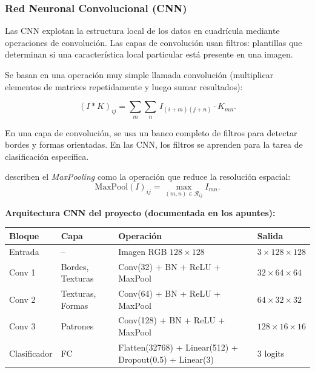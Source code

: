 \documentclass[12pt, a4paper]{article}
\begin{document}
\subsubsection{Red Neuronal Convolucional (CNN)}

Las CNN explotan la estructura local de los datos en cuadrícula
mediante operaciones de convolución. Las capas de convolución usan
filtros: plantillas que determinan si una característica local
particular está presente en una imagen.

Se basan en una operación muy simple llamada convolución (multiplicar
elementos de matrices repetidamente y luego sumar resultados):

\begin{equation}
  (I * K)_{ij} = \sum_{m} \sum_{n}\, I_{(i+m)(j+n)} \cdot K_{mn}.
  \label{eq:convolucion}
\end{equation}

En una capa de convolución, se usa un banco completo de filtros para
detectar bordes y formas orientadas. En las CNN, los filtros se
aprenden para la tarea de clasificación específica.

\citet[Sec.~10.3.2]{islp2023} describen el \textit{MaxPooling} como
la operación que reduce la resolución espacial:
\begin{equation}
  \text{MaxPool}(I)_{ij} = \max_{(m,n)\in\mathcal{R}_{ij}} I_{mn}.
  \label{eq:maxpool}
\end{equation}

\textbf{Arquitectura CNN del proyecto (documentada en los apuntes):}
\begin{table}[H]
  \centering
  \small
  \setlength{\tabcolsep}{5pt}
  \renewcommand{\arraystretch}{1.2}
  \begin{tabular}{p{1.8cm} p{2.4cm} p{7.5cm} p{2.4cm}}
    \toprule
    \textbf{Bloque} & \textbf{Capa} & \textbf{Operación} & \textbf{Salida} \\
    \midrule
    Entrada      & --               & Imagen RGB $128\times128$
                   & $3\times128\times128$ \\
    Conv 1       & Bordes, Texturas & Conv(32) + BN + ReLU + MaxPool
                   & $32\times64\times64$ \\
    Conv 2       & Texturas, Formas & Conv(64) + BN + ReLU + MaxPool
                   & $64\times32\times32$ \\
    Conv 3       & Patrones         & Conv(128) + BN + ReLU + MaxPool
                   & $128\times16\times16$ \\
    Clasificador & FC               & Flatten(32768) + Linear(512) +
                   Dropout(0.5) + Linear(3) & 3 logits \\
    \bottomrule
  \end{tabular}
\end{table}
\end{document}
